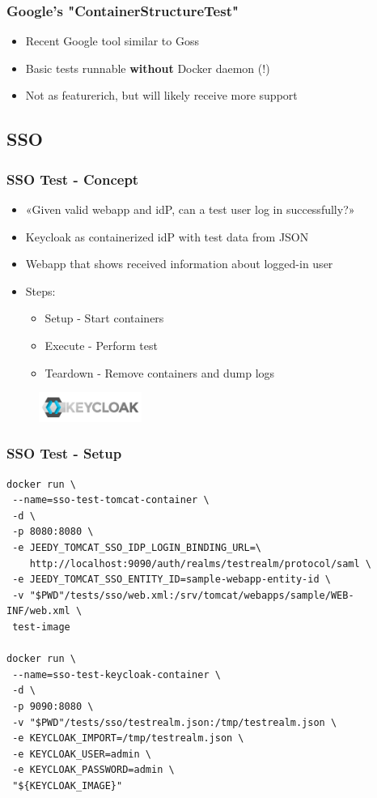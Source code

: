 \documentclass[14pt,aspectratio=169]{beamer}
\begin{document}
\begin{frame}
  \frametitle{Google's "ContainerStructureTest"}
  \begin{itemize}
    \item Recent Google tool similar to Goss
    \item Basic tests runnable \textbf{without} Docker daemon (!)
    \item Not as featurerich, but will likely receive more support
  \end{itemize}
\end{frame}

\subsection{SSO}

\begin{frame}
  \frametitle{SSO Test - Concept} 
  \begin{itemize}
    \item «Given valid webapp and idP, can a test user log in successfully?»
    \item Keycloak as containerized idP with test data from JSON
    \item Webapp that shows received information about logged-in user
    \item Steps:
    \begin{itemize}
      \item Setup - Start containers
      \item Execute - Perform test
      \item Teardown - Remove containers and dump logs
    \end{itemize}
  \end{itemize}
  \begin{figure}
    \includegraphics[width=0.3\textwidth]{images/keycloak_logo.png}
  \end{figure}
\end{frame}

\begin{frame}[fragile]
  \frametitle{SSO Test - Setup}

  \begin{verbatim}
docker run \
 --name=sso-test-tomcat-container \
 -d \
 -p 8080:8080 \
 -e JEEDY_TOMCAT_SSO_IDP_LOGIN_BINDING_URL=\
    http://localhost:9090/auth/realms/testrealm/protocol/saml \
 -e JEEDY_TOMCAT_SSO_ENTITY_ID=sample-webapp-entity-id \
 -v "$PWD"/tests/sso/web.xml:/srv/tomcat/webapps/sample/WEB-INF/web.xml \
 test-image

docker run \
 --name=sso-test-keycloak-container \
 -d \
 -p 9090:8080 \
 -v "$PWD"/tests/sso/testrealm.json:/tmp/testrealm.json \
 -e KEYCLOAK_IMPORT=/tmp/testrealm.json \
 -e KEYCLOAK_USER=admin \
 -e KEYCLOAK_PASSWORD=admin \
 "${KEYCLOAK_IMAGE}"
  \end{verbatim}
\end{frame}
\end{document}
